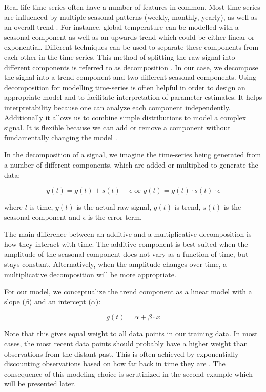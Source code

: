 \documentclass{article}
\begin{document}
Real life time-series often have a number of features in common. Most time-series are influenced by multiple seasonal patterns (weekly, monthly, yearly), as well as an overall trend \cite{taylor2018forecasting}. For instance, global temperature can be modelled with a seasonal component as well as an upwards trend which could be either linear or exponential. Different techniques can be used to separate these components from each other in the time-series. This method of splitting the raw signal into different components is referred to as decomposition \cite{fpp3, taylor2018forecasting}. In our case, we decompose the signal into a trend component and two different seasonal components. Using decomposition for modelling time-series is often helpful in order to design an appropriate model and to facilitate interpretation of parameter estimates. It helps interpretability because one can analyze each component independently. Additionally it allows us to combine simple distributions to model a complex signal. It is flexible because we can add or remove a component without fundamentally changing the model \cite{taylor2018forecasting}. 

In the decomposition of a signal, we imagine the time-series being generated from a number of different components, which are added or multiplied to generate the data;

$$y(t) = g(t) + s(t) + \epsilon \mbox{   or   } y(t) = g(t) \cdot s(t) \cdot \epsilon$$

\noindent where $t$ is time, $y(t)$ is the actual raw signal, $g(t)$ is trend, $s(t)$ is the seasonal component and $\epsilon$ is the error term. 

\noindent The main difference between an additive and a multiplicative decomposition is how they interact with time. The additive component is best suited when the amplitude of the seasonal component does not vary as a function of time, but stays constant. Alternatively, when the amplitude changes over time, a multiplicative decomposition will be more appropriate. 

\noindent For our model, we conceptualize the trend component as a linear model with a slope ($\beta$) and an intercept ($\alpha$):

$$g(t) = \alpha + \beta \cdot x$$

\noindent Note that this gives equal weight to all data points in our training data. In most cases, the most recent data points should probably have a higher weight than observations from the distant past. This is often achieved by exponentially discounting observations based on how far back in time they are \cite{gilchrist1967methods}. The consequence of this modeling choice is scrutinized in the second example which will be presented later.
\end{document}
